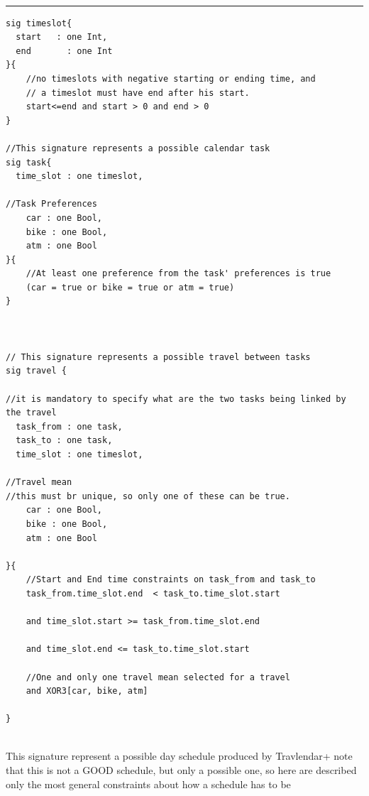\\
\rule{\textwidth}{0.4pt}

\begin{verbatim}
sig timeslot{
  start   : one Int,
  end		: one Int 
}{
    //no timeslots with negative starting or ending time, and
    // a timeslot must have end after his start.
	start<=end and start > 0 and end > 0
}

//This signature represents a possible calendar task
sig task{
  time_slot : one timeslot,

//Task Preferences
    car : one Bool,
    bike : one Bool,
    atm : one Bool
}{
    //At least one preference from the task' preferences is true
    (car = true or bike = true or atm = true)
}



// This signature represents a possible travel between tasks
sig travel {

//it is mandatory to specify what are the two tasks being linked by the travel
  task_from : one task,
  task_to : one task,
  time_slot : one timeslot,

//Travel mean 
//this must br unique, so only one of these can be true.
    car : one Bool,
    bike : one Bool,
    atm : one Bool

}{
    //Start and End time constraints on task_from and task_to
    task_from.time_slot.end  < task_to.time_slot.start   

    and time_slot.start >= task_from.time_slot.end         

    and time_slot.end <= task_to.time_slot.start

    //One and only one travel mean selected for a travel
    and XOR3[car, bike, atm]

}
\end{verbatim}
\hrulefill 
\\
This signature represent a possible day schedule produced by Travlendar+
note that this is not a GOOD schedule, but only a possible one, so here
are described only the most general constraints about how a schedule has to
be
